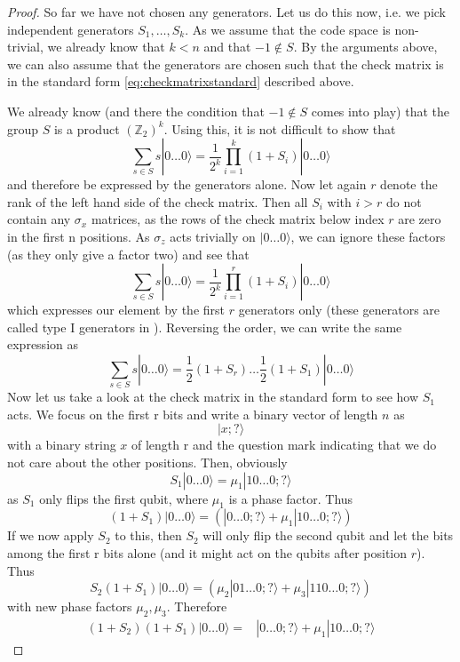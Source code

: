 \documentclass[a4paper, draft]{article}
\theoremstyle{own}
\theoremstyle{remark}
\newcommand{\Z}{\mathbb{Z}}
\begin{document}
\begin{proof}
So far we have not chosen any generators. Let us do this now, i.e. we pick independent generators $S_1, \dots, S_k$. As we assume that the code space is non-trivial, we already know that $k < n$ and that $-1 \notin S$. By the arguments above, we can also assume that the generators are chosen such that the check matrix is in the standard form  \eqref{eq:checkmatrixstandard} described above. 

We already know (and there the condition that $-1 \notin S$ comes into play) that the group $S$ is a product $(\Z_2)^k$. Using this, it is not difficult to show that 
$$
\sum_{s \in S}s  |0 \dots 0 \rangle = \frac{1}{2^k} \prod_{i=1}^k (1 + S_i) |0 \dots 0 \rangle
$$
and therefore be expressed by the generators alone. Now let again $r$ denote the rank of the left hand side of the check matrix. Then all $S_i$ with $i > r$ do not contain any $\sigma_x$ matrices, as the rows of the check matrix below index $r$ are zero in the first n positions. As $\sigma_z$ acts trivially on $|0 \dots 0 \rangle$, we can ignore these factors (as they only give a factor two) and see that
$$
\sum_{s \in S} s |0 \dots 0 \rangle = \frac{1}{2^k} \prod_{i=1}^r (1 + S_i) |0 \dots 0 \rangle
$$
which expresses our element by the first $r$ generators only (these generators are called type I generators in \cite{GThesis}). Reversing the order, we can write the same expression as
$$
\sum_{s \in S} s |0 \dots 0 \rangle = \frac{1}{2}(1 + S_r) \dots \frac{1}{2} (1 + S_1) |0 \dots 0 \rangle
$$
Now let us take a look at the check matrix in the standard form to see how $S_1$ acts. We focus on the first r bits and write a binary vector of length $n$ as
$$
| x ; ? \rangle
$$
with a binary string $x$ of length r and the question mark indicating that we do not care about the other positions. Then, obviously 
$$
S_1 |0 \dots 0 \rangle = \mu_1 |1 0 \dots 0 ; ? \rangle
$$
as $S_1$ only flips the first qubit, where $\mu_1$ is a phase factor. Thus
$$
(1 + S_1) |0 \dots 0 \rangle = (  |0 \dots 0; ? \rangle + \mu_1 |1 0 \dots 0 ; ? \rangle 
)
$$
If we now apply $S_2$ to this, then $S_2$ will only flip the second qubit and let the bits among the first r bits alone (and it might act on the qubits after position $r$). Thus
$$
S_2 (1 + S_1) |0 \dots 0 \rangle = ( \mu_2 |0 1 \dots 0; ? \rangle + \mu_3 |1 1 0 \dots 0 ; ? \rangle 
)
$$
with new phase factors $\mu_2, \mu_3$. Therefore 
\begin{align*}
(1 + S_2)(1 + S_1) | 0 \dots 0 \rangle 
 =
& |0 \dots 0; ? \rangle + \mu_1 |1 0 \dots 0 ; ? \rangle 

\end{align*}
\end{proof}
\end{document}
